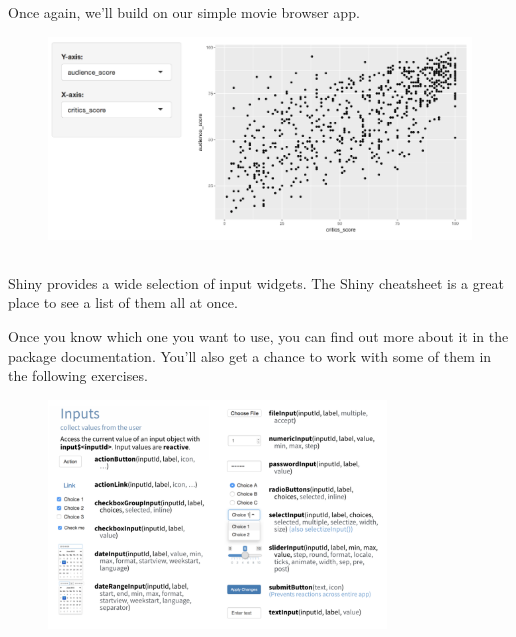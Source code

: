 \documentclass[
  letterpaper,
  DIV=11,
  numbers=noendperiod]{scrreprt}
\begin{document}
Once again, we'll build on our simple movie browser app.

\begin{figure}

{\centering \includegraphics[width=1\textwidth,height=\textheight]{./images/app-selectinput-scatterplot.png}

}

\end{figure}

\hypertarget{section-17}{%
\subsection{}\label{section-17}}

Shiny provides a wide selection of input widgets. The Shiny cheatsheet
is a great place to see a list of them all at once.

Once you know which one you want to use, you can find out more about it
in the package documentation. You'll also get a chance to work with some
of them in the following exercises.

\begin{figure}

{\centering \includegraphics[width=0.8\textwidth,height=\textheight]{./images/cheatsheet-inputs.png}

}

\end{figure}
\end{document}
